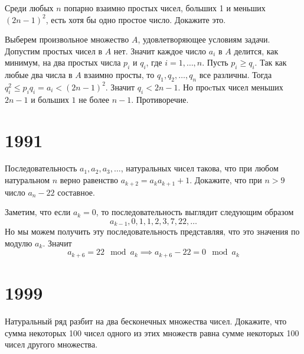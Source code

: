 \documentclass[11pt, a4paper]{template}
\begin{document}
\begin{exercise}[M557]
Среди любых $n$ попарно взаимно простых чисел, больших 1 и меньших $(2n - 1)^{2}$, есть хотя бы одно простое число. Докажите это.
\end{exercise}

\begin{solution}
Выберем произвольное множество $A$, удовлетворяющее условиям задачи. Допустим простых чисел в $A$ нет. Значит каждое число $a_{i}$ в $A$ делится, как минимум, на два простых числа $p_{i}$ и $q_{i}$, где $i = 1, \dots, n$. Пусть $p_{i} \geqslant q_{i}$.  Так как любые два числа в $A$ взаимно просты, то $q_{1}, q_{2}, \dots, q_{n}$ все различны. Тогда $q_{i}^{2} \leqslant p_{i} q_{i} = a_{i} < (2n - 1)^{2}$. Значит $q_{i} < 2n - 1$. Но проcтых чисел меньших $2n - 1$ и больших $1$ не более $n - 1$. Противоречие.
\end{solution}

\chapter{1991}

\begin{exercise}[M1275]
Последовательность $a_{1}, a_{2}, a_{3}, \dots$, натуральных чисел такова, что при любом натуральном $n$ верно равенство $a_{k+2} = a_{k} a_{k+1} + 1$. Докажите, что при $n > 9$ число $a_{n} - 22$ составное.
\end{exercise}

\begin{solution}
Заметим, что если $a_{k} = 0$, то последовательность выглядит следующим образом
$$
a_{k-1}, 0, 1, 1, 2, 3, 7, 22, \dots 
$$
Но мы можем получить эту последовательность представляя, что это значения по модулю $a_{k}$. Значит 
$$
a_{k+6} = 22 \mod a_{k} \implies a_{k+6} - 22 = 0 \mod a_{k}
$$
\end{solution}

\begin{exercise}

\end{exercise}

\chapter{1999}

\begin{exercise}[M1667]
Натуральный ряд разбит на два бесконечных множества чисел. Докажите, что сумма некоторых 100 чисел одного из этих множеств равна сумме некоторых 100 чисел другого множества.
\end{exercise}
\end{document}
